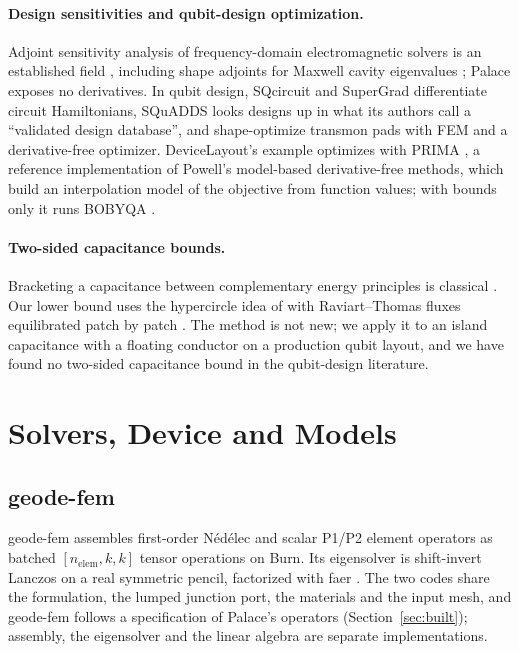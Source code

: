 \documentclass{anvil-paper}
\begin{document}
\paragraph{Design sensitivities and qubit-design optimization.}
Adjoint sensitivity analysis of frequency-domain electromagnetic solvers is
an established field \citep{nikolova2004adjoint}, including shape adjoints
for Maxwell cavity eigenvalues \citep{akcelik2005adjoint}; Palace exposes no
derivatives.
In qubit design, SQcircuit \citep{rajabzadeh2023analysis} and
SuperGrad \citep{wang2025supergrad} differentiate circuit Hamiltonians,
SQuADDS \citep{shanto2024squadds} looks designs up in what its authors
call a ``validated design database'', and \citet{eun2023shape} shape-optimize transmon pads with FEM
and a derivative-free optimizer.
DeviceLayout's example optimizes with PRIMA \citep{zhang2023prima}, a
reference implementation of Powell's model-based derivative-free methods,
which build an interpolation model of the objective from function values;
with bounds only it runs BOBYQA \citep{powell2009bobyqa}.

\paragraph{Two-sided capacitance bounds.}
Bracketing a capacitance between complementary energy principles is
classical \citep{specogna2011complementary}. Our lower bound uses the
hypercircle idea of \citet{prager1947approximations} with Raviart--Thomas
fluxes \citep{raviart1977mixed} equilibrated patch by patch
\citep{braess2007equilibrated,ern2015polynomial}. The method is not new; we
apply it to an island capacitance with a floating conductor on a
production qubit layout, and we have found no two-sided capacitance bound in the
qubit-design literature.

\section{Solvers, Device and Models}
\label{sec:setup}

\subsection{geode-fem}
\label{sec:architecture}

geode-fem assembles first-order N\'ed\'elec \citep{nedelec1980} and scalar
P1/P2 element operators as batched $[n_{\mathrm{elem}},k,k]$ tensor
operations on Burn. Its eigensolver is shift-invert Lanczos \citep{arpack}
on a real symmetric pencil, factorized with faer \citep{kazdadi2026faer}. The two codes share the
formulation, the lumped junction port, the materials and the input mesh,
and geode-fem follows a specification of Palace's operators
(Section~\ref{sec:built}); assembly, the eigensolver and the linear algebra
are separate implementations.
\end{document}
